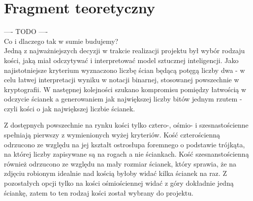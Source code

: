 \chapter{Fragment teoretyczny}

---- TODO ---- \\

Co i dlaczego tak w sumie budujemy? \\

Jedną z najważniejszych decyzji w trakcie realizacji projektu był wybór rodzaju kości, jaką miał odczytywać 
i interpretować model sztucznej inteligencji. Jako najistotniejsze kryterium wyznaczono liczbę ścian będącą 
potęgą liczby dwa - w celu łatwej interpretacji wyniku w notacji binarnej, stosowanej powszechnie w kryptografii.
W następnej kolejności szukano kompromisu pomiędzy łatwością w odczycie ścianek a generowaniem jak największej liczby
bitów jednym rzutem - czyli kości o jak największej liczbie ścianek. 
\par
Z dostępnych powszechnie na rynku kości tylko cztero-, ośmio- i szesnastościenne spełniają pierwszy z wymienionych
wyżej kryteriów. Kość czterościenną odrzucono ze względu na jej kształt ostrosłupa foremnego o podstawie trójkąta, 
na której liczby zapisywane są na rogach a nie ściankach. Kość szesnanstościenną również odrzucono ze względu na
mały rozmiar ścianek, który sprawia, że na zdjęciu robionym idealnie nad kością byłoby widać kilka ścianek na raz.
Z pozostałych opcji tylko na kości ośmiościennej widać z góry dokładnie jedną ściankę, zatem to ten rodzaj kości
został wybrany do projektu.